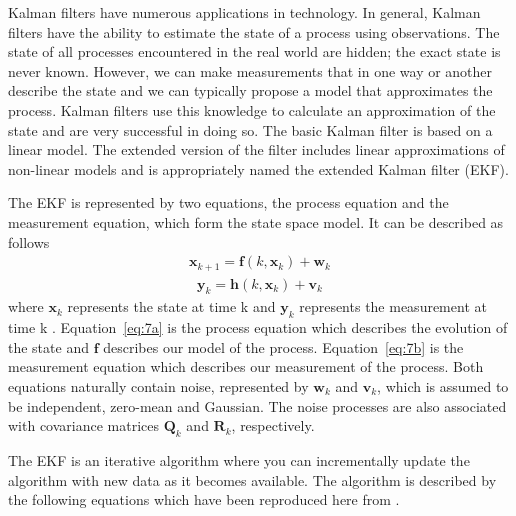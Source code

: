 \documentclass[11pt,letterpaper,titlepage]{article}
\numberwithin{equation}{section}
\numberwithin{figure}{section}
\numberwithin{table}{section}
\begin{document}
Kalman filters have numerous applications in technology. In general, Kalman filters have the ability to estimate the state of a process using observations. The state of all processes encountered in the real world are hidden; the exact state is never known. However, we can make measurements that in one way or another describe the state and we can typically propose a model that approximates the process. Kalman filters use this knowledge to calculate an approximation of the state and are very successful in doing so. The basic Kalman filter is based on a linear model. The extended version of the filter includes linear approximations of non-linear models and is appropriately named the extended Kalman filter (EKF). 

The EKF is represented by two equations, the process equation and the measurement equation, which form the state space model. It can be described as follows
\begin{gather}
  \label{eq:7a}
  \mathbf{x}_{k+1} = \mathbf{f}(k, \mathbf{x}_k) + \mathbf{w}_k
\end{gather}
\begin{gather}
  \label{eq:7b}
  \mathbf{y}_k = \mathbf{h}(k, \mathbf{x}_k) + \mathbf{v}_k
\end{gather}
where \(\mathbf{x}_k\) represents the state at time k and \(\mathbf{y}_k\) represents the measurement at time k \cite{Haykin2001}. Equation~\ref{eq:7a} is the process equation which describes the evolution of the state and \(\mathbf{f}\) describes our model of the process. Equation~\ref{eq:7b} is the measurement equation which describes our measurement of the process. Both equations naturally contain noise, represented by \(\mathbf{w}_k\) and \(\mathbf{v}_k\), which is assumed to be independent, zero-mean and Gaussian. The noise processes are also associated with covariance matrices \(\mathbf{Q}_k\) and \(\mathbf{R}_k\), respectively.

The EKF is an iterative algorithm where you can incrementally update the algorithm with new data as it becomes available. The algorithm is described by the following equations which have been reproduced here from \cite{Haykin2001}.
\end{document}
